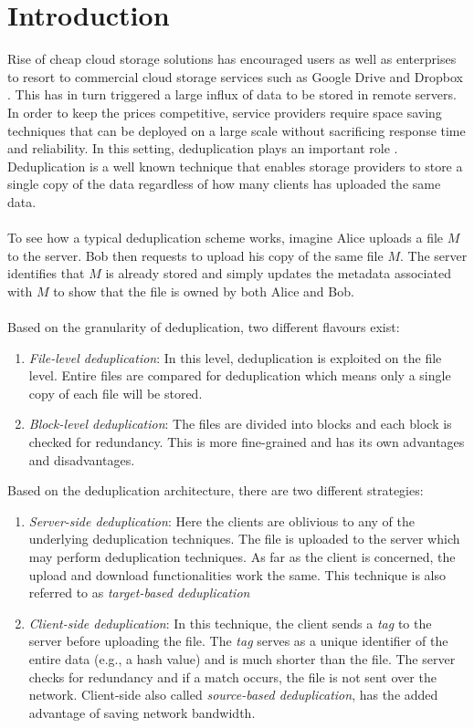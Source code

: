 \chapter{Introduction}
\label{chap:introduction}

Rise of cheap cloud storage solutions has encouraged users as well as enterprises to
resort to commercial cloud storage services such as Google Drive \cite{googleDrive} and 
Dropbox \cite{dropbox}. This has in turn triggered a large influx of data to be stored
in remote servers. In order to keep the prices competitive, service providers require
space saving techniques that can be deployed on a large scale without sacrificing
response time and reliability. In this setting, deduplication plays an important role \cite{practicaldedup}.
Deduplication is a well known technique that enables storage providers to store a single
copy of the data regardless of how many clients has uploaded the same data.
\\ \\
To see how a typical deduplication scheme works, imagine Alice uploads a file
$M$ to the server. Bob then requests to upload his copy of the same file $M$. The server identifies
that $M$ is already stored and simply updates the metadata associated with $M$ to show
that the file is owned by both Alice and Bob.
\\ \\
Based on the granularity of deduplication, two different flavours exist:
\begin{enumerate}
	\item \textit{File-level deduplication}: In this level, deduplication is
	exploited on the file level. Entire files are compared for deduplication
	which means only a single copy of each file will be stored.
	
	\item \textit{Block-level deduplication}: The files are divided into blocks and
	each block is checked for redundancy. This is more fine-grained and has its own
	advantages and disadvantages.
\end{enumerate}
\noindent
Based on the deduplication architecture, there are two different strategies:
\begin{enumerate}
	\item \textit{Server-side deduplication}: Here the clients are oblivious to any of the
	underlying deduplication techniques. The file is uploaded to the server which
	may perform deduplication techniques. As far as the client is concerned, the upload and download
	functionalities work the same. This technique is also referred to as 
	\textit{target-based deduplication}
	
	\item \textit{Client-side deduplication}: In this technique, the client sends a \textit{tag}
	to the server before uploading the file. The \textit{tag} serves as a unique identifier of
	the entire data (e.g., a hash value) and is much shorter than the file. The server checks for
	redundancy and if a match occurs, the file is not sent over the network. Client-side also called
	\textit{source-based deduplication}, has the added advantage of saving network bandwidth.
\end{enumerate}
